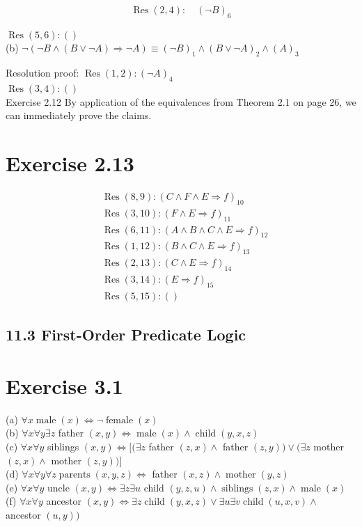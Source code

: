 \documentclass[10pt]{book}
\begin{document}
\begin{center}
\begin{enumerate}
\begin{center}
\begin{center}
\begin{center}
\begin{center}
\begin{center}
$$
\operatorname{Res}(2,4): \quad(\neg B)_{6}
$$

$\operatorname{Res}(5,6):()$\\
(b) $\neg(\neg B \wedge(B \vee \neg A) \Rightarrow \neg A) \equiv(\neg B)_{1} \wedge(B \vee \neg A)_{2} \wedge(A)_{3}$

Resolution proof: $\operatorname{Res}(1,2):(\neg A)_{4}$\\
$\operatorname{Res}(3,4):()$\\
Exercise 2.12 By application of the equivalences from Theorem 2.1 on page 26, we can immediately prove the claims.

\section*{Exercise 2.13}
$$
\begin{aligned}
& \operatorname{Res}(8,9):(C \wedge F \wedge E \Rightarrow f)_{10} \\
& \operatorname{Res}(3,10):(F \wedge E \Rightarrow f)_{11} \\
& \operatorname{Res}(6,11):(A \wedge B \wedge C \wedge E \Rightarrow f)_{12} \\
& \operatorname{Res}(1,12):(B \wedge C \wedge E \Rightarrow f)_{13} \\
& \operatorname{Res}(2,13):(C \wedge E \Rightarrow f)_{14} \\
& \operatorname{Res}(3,14):(E \Rightarrow f)_{15} \\
& \operatorname{Res}(5,15):()
\end{aligned}
$$

\subsection*{11.3 First-Order Predicate Logic}
\section*{Exercise 3.1}
(a) $\forall x \operatorname{male}(x) \Leftrightarrow \neg \operatorname{female}(x)$\\
(b) $\forall x \forall y \exists z$ father $(x, y) \Leftrightarrow \operatorname{male}(x) \wedge \operatorname{child}(y, x, z)$\\
(c) $\forall x \forall y$ siblings $(x, y) \Leftrightarrow[(\exists z$ father $(z, x) \wedge$ father $(z, y)) \vee(\exists z$ mother $(z, x) \wedge$ mother $(z, y))]$\\
(d) $\forall x \forall y \forall z \operatorname{parents}(x, y, z) \Leftrightarrow$ father $(x, z) \wedge \operatorname{mother}(y, z)$\\
(e) $\forall x \forall y$ uncle $(x, y) \Leftrightarrow \exists z \exists u$ child $(y, z, u) \wedge \operatorname{siblings}(z, x) \wedge \operatorname{male}(x)$\\
(f) $\forall x \forall y$ ancestor $(x, y) \Leftrightarrow \exists z \operatorname{child}(y, x, z) \vee \exists u \exists v \operatorname{child}(u, x, v) \wedge$ ancestor $(u, y))$


\end{center}
\end{center}
\end{center}
\end{center}
\end{center}
\end{enumerate}
\end{center}
\end{document}
